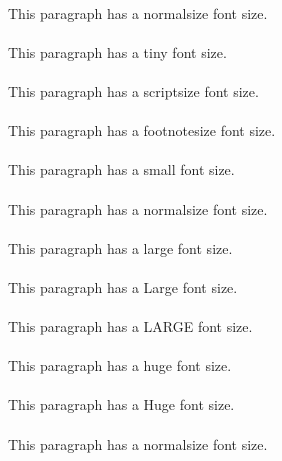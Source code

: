     \normalsize{}\paragraph{}This paragraph has a normalsize font size.
    \tiny{}\paragraph{}This paragraph has a tiny font size.
    \scriptsize{}\paragraph{}This paragraph has a scriptsize font size.
    \footnotesize{}\paragraph{}This paragraph has a footnotesize font size.
    \small{}\paragraph{}This paragraph has a small font size.
    \normalsize{}\paragraph{}This paragraph has a normalsize font size.
    \large{}\paragraph{}This paragraph has a large font size.
    \Large{}\paragraph{}This paragraph has a Large font size.
    \LARGE{}\paragraph{}This paragraph has a LARGE font size.
    \huge{}\paragraph{}This paragraph has a huge font size.
    \Huge{}\paragraph{}This paragraph has a Huge font size.
    \normalsize{}\paragraph{}This paragraph has a normalsize font size.

